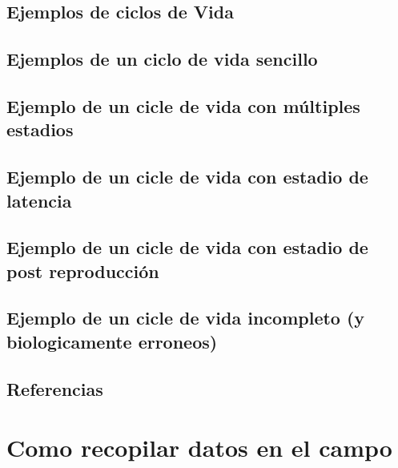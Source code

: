 \documentclass[
]{book}
\theoremstyle{definition}
\theoremstyle{definition}
\theoremstyle{definition}
\theoremstyle{definition}
\theoremstyle{remark}
\begin{document}
\hypertarget{ejemplos-de-ciclos-de-vida}{%
\section{Ejemplos de ciclos de Vida}\label{ejemplos-de-ciclos-de-vida}}

\hypertarget{ejemplos-de-un-ciclo-de-vida-sencillo}{%
\section{Ejemplos de un ciclo de vida sencillo}\label{ejemplos-de-un-ciclo-de-vida-sencillo}}

\hypertarget{ejemplo-de-un-cicle-de-vida-con-muxfaltiples-estadios}{%
\section{Ejemplo de un cicle de vida con múltiples estadios}\label{ejemplo-de-un-cicle-de-vida-con-muxfaltiples-estadios}}

\hypertarget{ejemplo-de-un-cicle-de-vida-con-estadio-de-latencia}{%
\section{Ejemplo de un cicle de vida con estadio de latencia}\label{ejemplo-de-un-cicle-de-vida-con-estadio-de-latencia}}

\hypertarget{ejemplo-de-un-cicle-de-vida-con-estadio-de-post-reproducciuxf3n}{%
\section{Ejemplo de un cicle de vida con estadio de post reproducción}\label{ejemplo-de-un-cicle-de-vida-con-estadio-de-post-reproducciuxf3n}}

\hypertarget{ejemplo-de-un-cicle-de-vida-incompleto-y-biologicamente-erroneos}{%
\section{Ejemplo de un cicle de vida incompleto (y biologicamente erroneos)}\label{ejemplo-de-un-cicle-de-vida-incompleto-y-biologicamente-erroneos}}

\hypertarget{referencias-1}{%
\section{Referencias}\label{referencias-1}}

\hypertarget{como-recopilar-datos-en-el-campo}{%
\chapter{Como recopilar datos en el campo}\label{como-recopilar-datos-en-el-campo}}
\end{document}
